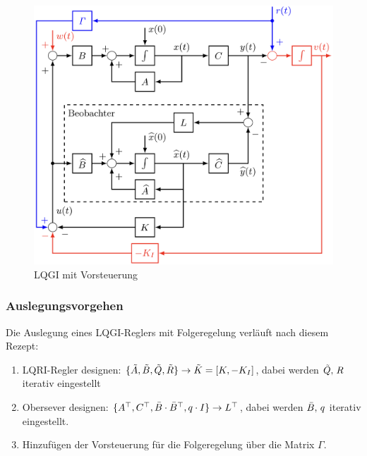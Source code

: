     \begin{figure}[H]
        \centering
        \includegraphics[width = 0.7\linewidth]{images/10/LQGI_Vorstr.jpeg}
        \caption{LQGI mit Vorsteuerung}
    \end{figure}
    
    \subsubsection{Auslegungsvorgehen}
        Die Auslegung eines LQGI-Reglers mit Folgeregelung verläuft nach diesem Rezept:
        
        \begin{enumerate}
            \item LQRI-Regler designen: $\{\Tilde{A},\Tilde{B},\Tilde{Q},\Tilde{R}\}\rightarrow \Tilde{K} = [K, -K_I]$, dabei werden $\Tilde{Q},\, R$ iterativ eingestellt
            
            \item Obersever designen: $\{A^\top, C^\top,\Bar{B}\cdot\Bar{B}^\top,q\cdot I\}\rightarrow L^\top$, dabei werden $\Bar{B},\, q$ iterativ eingestellt.
            
            \item Hinzufügen der Vorsteuerung für die Folgeregelung über die Matrix $\mathit{\Gamma}$.
        \end{enumerate}